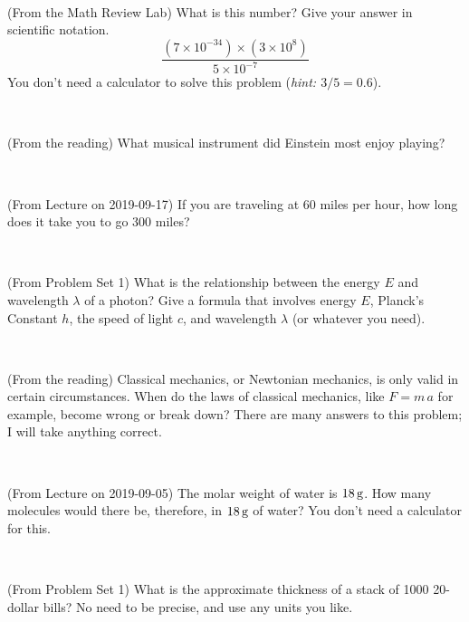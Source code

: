 \documentclass[12pt, letterpaper]{article}
\begin{document}
\vfill ~

\begin{problem} (From the Math Review Lab)
What is this number? Give your answer in scientific notation.
$$
\frac{(7\times10^{-34})\times(3\times10^8)}{5\times10^{-7}}
$$
You don't need a calculator to solve this problem (\textit{hint: $3/5=0.6$}).
\end{problem}


\vfill ~

\begin{problem} (From the reading)
What musical instrument did Einstein most enjoy playing?
\end{problem}


\vfill ~

\begin{problem} (From Lecture on 2019-09-17)
If you are traveling at 60 miles per hour, how long does
it take you to go 300 miles?
\end{problem}


\vfill ~


\clearpage


\begin{problem} (From Problem Set 1)
What is the relationship between the energy $E$ and wavelength
$\lambda$ of a photon? Give a formula that involves energy $E$,
Planck's Constant $h$, the speed of light $c$, and wavelength
$\lambda$ (or whatever you need).
\end{problem}

\vfill ~

\begin{problem} (From the reading)
Classical mechanics, or Newtonian mechanics, is only valid in certain
circumstances. When do the laws of classical mechanics, like $F =
m\,a$ for example, become wrong or break down? There are many answers
to this problem; I will take anything correct.
\end{problem}


\vfill ~

\begin{problem} (From Lecture on 2019-09-05)
The molar weight of water is $18\,\mathrm{g}$. How many molecules would there
be, therefore, in $18\,\mathrm{g}$ of water? You don't need a calculator for
this.
\end{problem}


\vfill ~

\begin{problem} (From Problem Set 1)
What is the approximate thickness of a stack of 1000 20-dollar bills?
No need to be precise, and use any units you like.
\end{problem}
\end{document}
